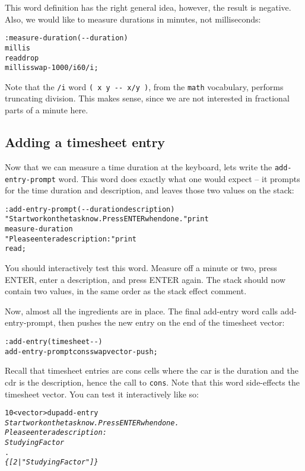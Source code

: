 \documentclass[english]{article}
\begin{document}
This word definition has the right general idea, however, the result
is negative. Also, we would like to measure durations in minutes,
not milliseconds:

\begin{alltt}
: measure-duration ( -{}- duration )
    millis
    read drop
    millis swap - 1000 /i 60 /i ;
\end{alltt}

Note that the \texttt{/i} word \texttt{( x y -{}- x/y )}, from the
\texttt{math} vocabulary, performs truncating division. This
makes sense, since we are not interested in fractional parts of a
minute here.

\subsection{Adding a timesheet entry}

Now that we can measure a time duration at the keyboard, lets write
the \texttt{add-entry-prompt} word. This word does exactly what one
would expect -- it prompts for the time duration and description,
and leaves those two values on the stack:

\begin{alltt}
: add-entry-prompt ( -{}- duration description )
    "Start work on the task now. Press ENTER when done." print
    measure-duration
    "Please enter a description:" print
    read ;
\end{alltt}

You should interactively test this word. Measure off a minute or two,
press ENTER, enter a description, and press ENTER again. The stack
should now contain two values, in the same order as the stack effect
comment.

Now, almost all the ingredients are in place. The final add-entry
word calls add-entry-prompt, then pushes the new entry on the end
of the timesheet vector:

\begin{alltt}
: add-entry ( timesheet -{}- )
    add-entry-prompt cons swap vector-push ;
\end{alltt}

Recall that timesheet entries are cons cells where the car is the
duration and the cdr is the description, hence the call to \texttt{cons}.
Note that this word side-effects the timesheet vector. You can test
it interactively like so:

\begin{alltt}
10 <vector> dup add-entry
\emph{Start work on the task now. Press ENTER when done.}
\emph{Please enter a description:}
\emph{Studying Factor}
.
\emph{\{ {[} 2 | "Studying Factor" {]} \}}
\end{alltt}
\end{document}
